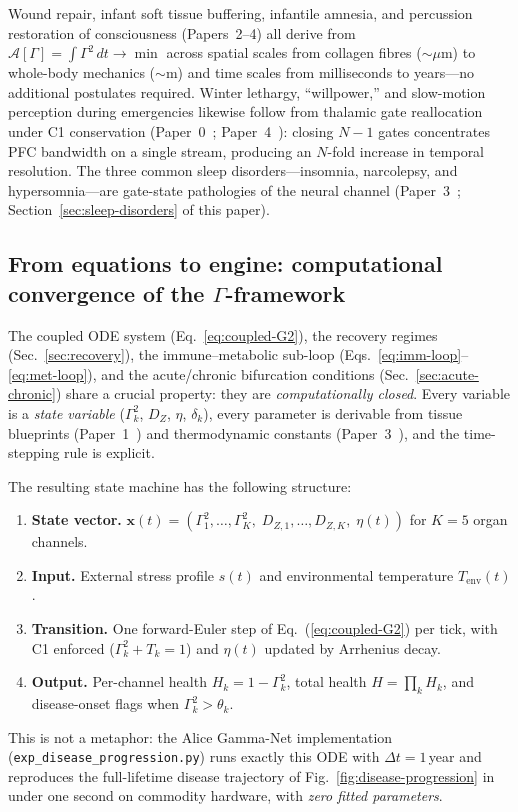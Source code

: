 \documentclass[aps,pre,twocolumn,superscriptaddress,floatfix]{revtex4-2}
\begin{document}
Wound repair, infant soft tissue buffering, infantile
amnesia, and percussion restoration of consciousness
(Papers~2--4) all derive from $\mathcal{A}[\Gamma]
= \int \Gamma^2\,dt \to \min$ across spatial scales
from collagen fibres ($\sim\mu$m) to whole-body
mechanics ($\sim$m) and time scales from milliseconds
to years---no additional postulates required.
Winter lethargy, ``willpower,'' and slow-motion
perception during emergencies likewise follow from
thalamic gate reallocation under C1 conservation
(Paper~0~\cite{Paper0}; Paper~4~\cite{Paper4}):
closing $N-1$ gates concentrates PFC bandwidth on a
single stream, producing an $N$-fold increase in
temporal resolution.
The three common sleep disorders---insomnia, narcolepsy,
and hypersomnia---are gate-state pathologies of the
neural channel
(Paper~3~\cite{Paper3};
Section~\ref{sec:sleep-disorders} of this paper).

\subsection{From equations to engine:
  computational convergence of the $\Gamma$-framework}
\label{sec:computational-convergence}

The coupled ODE system
(Eq.~\ref{eq:coupled-G2}),
the recovery regimes (Sec.~\ref{sec:recovery}),
the immune--metabolic sub-loop
(Eqs.~\ref{eq:imm-loop}--\ref{eq:met-loop}), and
the acute/chronic bifurcation conditions
(Sec.~\ref{sec:acute-chronic}) share a crucial
property: they are \emph{computationally closed}.
Every variable is a \emph{state variable}
($\Gamma_k^2$, $D_Z$, $\eta$, $\delta_k$),
every parameter is derivable from tissue blueprints
(Paper~1~\cite{Paper1}) and thermodynamic constants
(Paper~3~\cite{Paper3}), and the time-stepping
rule is explicit.

The resulting state machine has the following structure:
\begin{enumerate}
  \item \textbf{State vector.}
    $\mathbf{x}(t) = (\Gamma_1^2,\ldots,\Gamma_K^2,\;
    D_{Z,1},\ldots,D_{Z,K},\;\eta(t))$
    for $K = 5$ organ channels.
  \item \textbf{Input.}
    External stress profile $s(t)$ and
    environmental temperature $T_{\text{env}}(t)$.
  \item \textbf{Transition.}
    One forward-Euler step of
    Eq.~(\ref{eq:coupled-G2}) per tick,
    with C1 enforced ($\Gamma_k^2 + T_k = 1$)
    and $\eta(t)$ updated by Arrhenius decay.
  \item \textbf{Output.}
    Per-channel health $H_k = 1 - \Gamma_k^2$,
    total health $H = \prod_k H_k$,
    and disease-onset flags when
    $\Gamma_k^2 > \theta_k$.
\end{enumerate}
This is not a metaphor: the Alice Gamma-Net
implementation (\texttt{exp\_disease\_progression.py})
runs exactly this ODE with $\Delta t = 1$\,year
and reproduces the full-lifetime disease trajectory
of Fig.~\ref{fig:disease-progression} in under
one second on commodity hardware, with
\emph{zero fitted parameters}.
\end{document}
